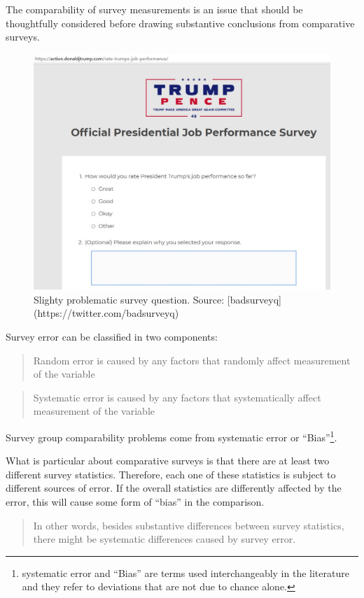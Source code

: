 \documentclass[
]{book}
\begin{document}
The comparability of survey measurements is an issue that should be thoughtfully considered before drawing substantive conclusions from comparative surveys.

\begin{figure}
\includegraphics[width=0.8\linewidth]{trump_pence} \caption{Slighty problematic survey question. Source: [badsurveyq](https://twitter.com/badsurveyq)}\label{fig:trump}
\end{figure}

Survey error can be classified in two components:

\begin{quote}
Random error is caused by any factors that randomly affect measurement of the variable
\end{quote}

\begin{quote}
Systematic error is caused by any factors that systematically affect measurement of the variable
\end{quote}

Survey group comparability problems come from systematic error or ``Bias''\footnote{systematic error and ``Bias'' are terms used interchangeably in the literature and they refer to deviations that are not due to chance alone.}.

What is particular about comparative surveys is that there are at least two different survey statistics. Therefore, each one of these statistics is subject to different sources of error. If the overall statistics are differently affected by the error, this will cause some form of ``bias'' in the comparison.

\begin{quote}
In other words, besides substantive differences between survey statistics, there might be systematic differences caused by survey error.
\end{quote}
\end{document}
